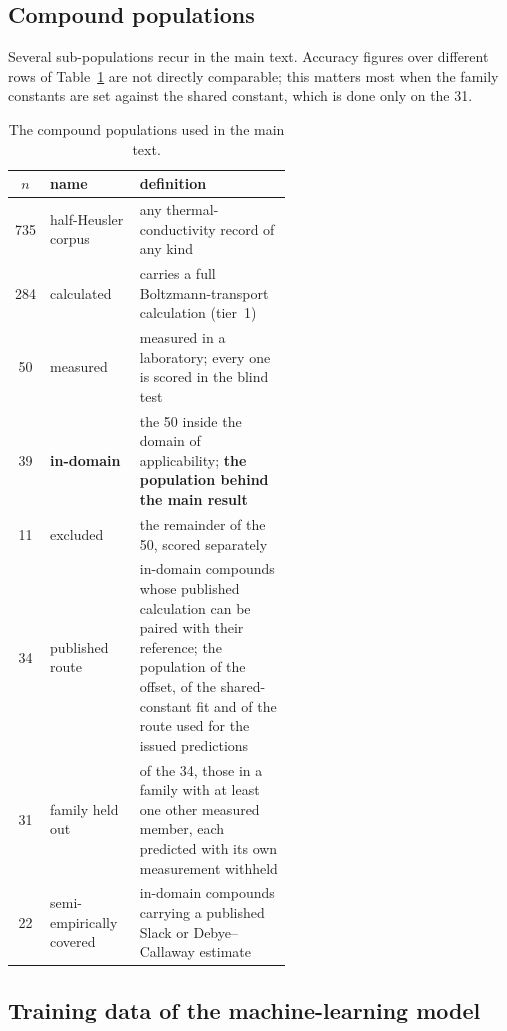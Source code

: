 \documentclass[preprint, 12pt]{elsarticle}
\begin{document}
\subsection*{Compound populations}

Several sub-populations recur in the main text. Accuracy figures over different rows of
Table~\ref{tab:populations} are not directly comparable; this matters most when the family constants
are set against the shared constant, which is done only on the \num{31}.

\begin{table}[htb]
  \centering
  \caption{The compound populations used in the main text.}
  \label{tab:populations}
  \small
  \begin{tabular}{clp{0.55\linewidth}}
    \toprule
    $n$ & name & definition \\
    \midrule
    \num{735} & half-Heusler corpus & any thermal-conductivity record of any kind \\
    \num{284} & calculated & carries a full Boltzmann-transport calculation (tier~1) \\
    \num{50}  & measured & measured in a laboratory; every one is scored in the blind test \\
    \midrule
    \num{39}  & \textbf{in-domain} & the \num{50} inside the domain of applicability;
                \textbf{the population behind the main result} \\
    \num{11}  & excluded & the remainder of the \num{50}, scored separately \\
    \midrule
    \num{34}  & published route & in-domain compounds whose published calculation can be paired with
                their reference; the population of the offset, of the shared-constant fit and of
                the route used for the issued predictions \\
    \num{31}  & family held out & of the \num{34}, those in a family with at least one other measured
                member, each predicted with its own measurement withheld \\
    \num{22}  & semi-empirically covered & in-domain compounds carrying a published Slack or
                Debye--Callaway estimate \\
    \bottomrule
  \end{tabular}
\end{table}

\subsection*{Training data of the machine-learning model}
\end{document}
